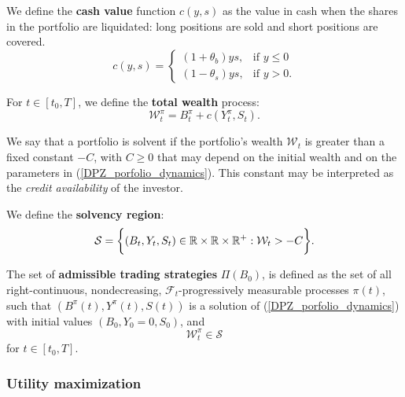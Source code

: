 \begin{Definition}
We define the \textbf{cash value} function $c(y,s)$ as the value in cash when the shares in the portfolio are liquidated:  
long positions are sold and short positions are covered.
\begin{equation}\label{cost_function}
c(y,s) = \begin{cases} 
(1+\theta_b)ys, & \mbox{if } y\leq 0 \\ 
(1-\theta_s)ys, & \mbox{if } y>0 . 
\end{cases} 
\end{equation} 
\end{Definition}
\begin{Definition}
For $t\in [t_0,T]$, we define the \textbf{total wealth} process:
\begin{equation}\label{wealth_process}
 \mathcal{W}^{\pi}_t = B^{\pi}_t + c(Y^{\pi}_t,S_t).
\end{equation} 
\end{Definition}
We say that a portfolio is solvent if the portfolio's wealth $\mathcal{W}_t$ is greater than a fixed constant $-C$, with 
$C\geq0$ that may depend on the initial wealth and on the parameters in (\ref{DPZ_porfolio_dynamics}). 
This constant may be interpreted as the \emph{credit availability} of the investor.
\begin{Definition}
We define the \textbf{solvency region}:
\begin{equation}\label{solvency_region}
 \mathcal{S} = \biggl\{ (B_t,Y_t,S_t) \in \mathbb{R} \times \mathbb{R} \times \mathbb{R}^+ : \mathcal{W}_t > -C  \biggr\}.
\end{equation} 
\end{Definition}
\begin{Definition}\label{admissible_strategies1}
The set of \textbf{admissible trading strategies} $\Pi(B_0)$, is defined   
as the set of all right-continuous, nondecreasing, $\mathcal{F}_t$-progressively measurable processes  
$\pi(t)$, such that $(B^\pi(t),Y^\pi(t),S(t))$ is a solution of (\ref{DPZ_porfolio_dynamics}) with initial values $( B_0,Y_0=0,S_0 )$, 
and 
\begin{equation}
 \mathcal{W}^{\pi}_t \in \mathcal{S}
\end{equation}
for $t \in [t_0,T]$.
\end{Definition}


\subsubsection{Utility maximization}

